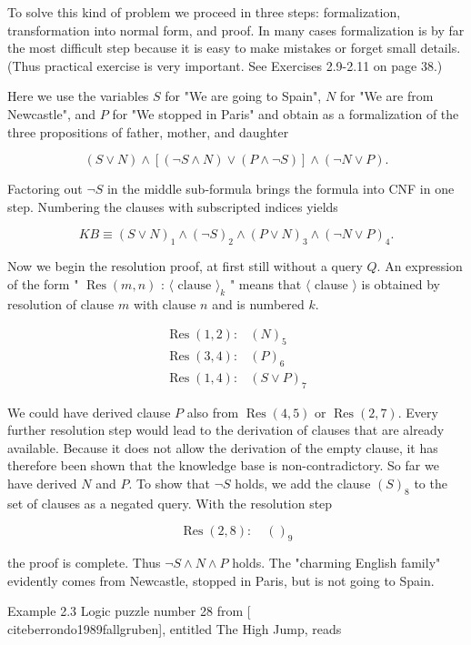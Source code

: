 \documentclass[10pt]{book}
\begin{document}
To solve this kind of problem we proceed in three steps: formalization, transformation into normal form, and proof. In many cases formalization is by far the most difficult step because it is easy to make mistakes or forget small details. (Thus practical exercise is very important. See Exercises 2.9-2.11 on page 38.)

Here we use the variables $S$ for "We are going to Spain", $N$ for "We are from Newcastle", and $P$ for "We stopped in Paris" and obtain as a formalization of the three propositions of father, mother, and daughter

$$
(S \vee N) \wedge[(\neg S \wedge N) \vee(P \wedge \neg S)] \wedge(\neg N \vee P) .
$$

Factoring out $\neg S$ in the middle sub-formula brings the formula into CNF in one step. Numbering the clauses with subscripted indices yields

$$
K B \equiv(S \vee N)_{1} \wedge(\neg S)_{2} \wedge(P \vee N)_{3} \wedge(\neg N \vee P)_{4} .
$$

Now we begin the resolution proof, at first still without a query $Q$. An expression of the form " $\operatorname{Res}(m, n)$ : $\langle\text { clause }\rangle_{k}$ " means that $\langle$ clause $\rangle$ is obtained by resolution of clause $m$ with clause $n$ and is numbered $k$.

$$
\begin{array}{ll}
\operatorname{Res}(1,2): & (N)_{5} \\
\operatorname{Res}(3,4): & (P)_{6} \\
\operatorname{Res}(1,4): & (S \vee P)_{7}
\end{array}
$$

We could have derived clause $P$ also from $\operatorname{Res}(4,5)$ or $\operatorname{Res}(2,7)$. Every further resolution step would lead to the derivation of clauses that are already available. Because it does not allow the derivation of the empty clause, it has therefore been shown that the knowledge base is non-contradictory. So far we have derived $N$ and $P$. To show that $\neg S$ holds, we add the clause $(S)_{8}$ to the set of clauses as a negated query. With the resolution step

$$
\operatorname{Res}(2,8): \quad()_{9}
$$

the proof is complete. Thus $\neg S \wedge N \wedge P$ holds. The "charming English family" evidently comes from Newcastle, stopped in Paris, but is not going to Spain.

Example 2.3 Logic puzzle number 28 from [\\cite{berrondo1989fallgruben}], entitled The High Jump, reads\\
\end{document}
